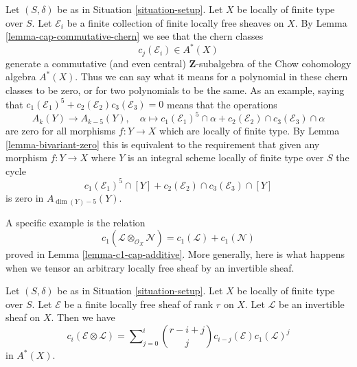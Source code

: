 \noindent
Let $(S, \delta)$ be as in Situation \ref{situation-setup}. Let $X$ be locally
of finite type over $S$. Let $\mathcal{E}_i$ be a finite collection of finite
locally free sheaves on $X$. By Lemma \ref{lemma-cap-commutative-chern}
we see that the chern classes
$$
c_j(\mathcal{E}_i) \in A^*(X)
$$
generate a commutative (and even central) $\mathbf{Z}$-subalgebra of the
Chow cohomology algebra $A^*(X)$.
Thus we can say what it means for a polynomial in these chern classes
to be zero, or for two polynomials to be the same. As an example, saying that
$c_1(\mathcal{E}_1)^5 + c_2(\mathcal{E}_2)c_3(\mathcal{E}_3) = 0$
means that the operations
$$
A_k(Y) \longrightarrow A_{k - 5}(Y), \quad
\alpha \longmapsto
c_1(\mathcal{E}_1)^5 \cap \alpha +
c_2(\mathcal{E}_2) \cap c_3(\mathcal{E}_3) \cap \alpha
$$
are zero for all morphisms $f : Y \to X$ which are locally of finite type.
By Lemma \ref{lemma-bivariant-zero}
this is equivalent to the requirement that given any morphism
$f : Y \to X$  where $Y$ is an integral scheme
locally of finite type over $S$ the cycle
$$
c_1(\mathcal{E}_1)^5 \cap [Y] +
c_2(\mathcal{E}_2) \cap c_3(\mathcal{E}_3) \cap [Y]
$$
is zero in $A_{\dim(Y) - 5}(Y)$.

\medskip\noindent
A specific example is the relation
$$
c_1(\mathcal{L} \otimes_{\mathcal{O}_X} \mathcal{N})
=
c_1(\mathcal{L}) + c_1(\mathcal{N})
$$
proved in Lemma \ref{lemma-c1-cap-additive}.
More generally, here is what happens when we tensor an
arbitrary locally free sheaf by an invertible sheaf.

\begin{lemma}
\label{lemma-chern-classes-E-tensor-L}
Let $(S, \delta)$ be as in Situation \ref{situation-setup}.
Let $X$ be locally of finite type over $S$.
Let $\mathcal{E}$ be a finite locally free sheaf of
rank $r$ on $X$. Let $\mathcal{L}$ be an invertible
sheaf on $X$. Then we have
\begin{equation}
\label{equation-twist}
c_i({\mathcal E} \otimes {\mathcal L})
=
\sum\nolimits_{j = 0}^i
\binom{r - i + j}{j} c_{i - j}({\mathcal E}) c_1({\mathcal L})^j
\end{equation}
in $A^*(X)$.
\end{lemma}

